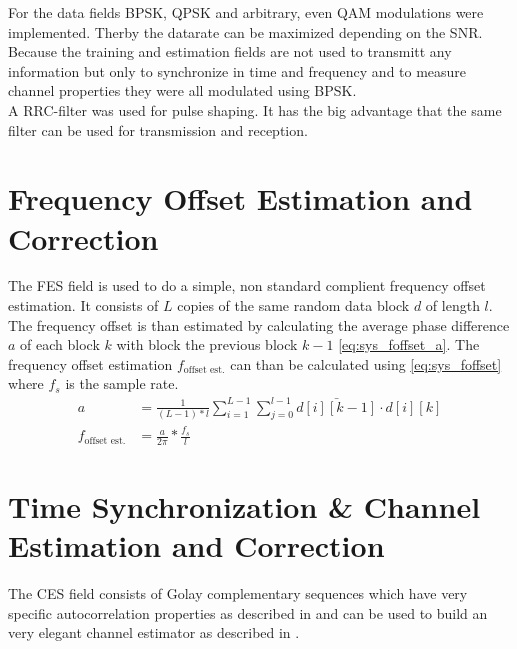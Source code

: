 For the data fields \gls{BPSK}, \gls{QPSK} and arbitrary, even
\gls{QAM} modulations were implemented. Therby the datarate
can be maximized depending on the \gls{SNR}. \\

Because the training and estimation fields are not used to
transmitt any information but only to synchronize in time
and frequency and to measure channel properties they were all
modulated using \gls{BPSK}. \\

A \gls{RRC}-filter was used for pulse shaping. It has the big advantage that
the same filter can be used for transmission and reception. \\

\section{Frequency Offset Estimation and Correction}
The \gls{FES} field is used to do a simple, non standard complient frequency
offset estimation. It consists of $L$ copies of the same random data block $d$
of length $l$.
The frequency offset is than estimated by calculating the average phase
difference $a$ of each block $k$ with block the previous block $k - 1$
\eqref{eq:sys_foffset_a}. The frequency offset estimation $f_{\text{offset est.}}$
can than be calculated using \eqref{eq:sys_foffset}
where $f_s$ is the sample rate. \\

\begin{subequations}
  \begin{alignat}{2}
    a &= \frac{1}{(L-1) * l}
    \sum_{i=1}^{L-1} \sum_{j=0}^{l-1} \bar{d[i][k-1]} \cdot d[i][k]
    \label{eq:sys_foffset_a} \\
    f_{\text{offset est.}} &= \frac{a}{2 \pi} * \frac{f_s}{l}
    \label{eq:sys_foffset}
  \end{alignat}
\end{subequations}

\section{Time Synchronization \& Channel Estimation and Correction}
The \gls{CES} field consists of Golay complementary sequences which
have very specific autocorrelation properties as described in
 and can be used to build an very elegant
channel estimator as described in . \\

